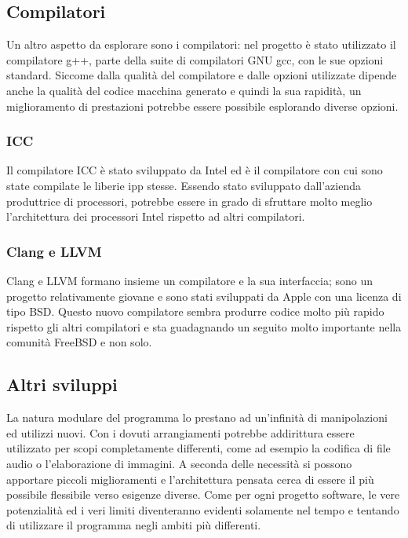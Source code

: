 \subsection{Compilatori}
Un altro aspetto da esplorare sono i compilatori: nel progetto \`e stato
utilizzato il compilatore g++, parte della suite di compilatori GNU gcc, con le
sue opzioni standard. Siccome dalla qualit\`a del compilatore e dalle opzioni
utilizzate dipende anche la qualit\`a del codice macchina generato e quindi la
sua rapidit\`a, un miglioramento di prestazioni potrebbe essere possibile
esplorando diverse opzioni.

\subsubsection{ICC}
Il compilatore ICC \`e stato sviluppato da Intel ed \`e il compilatore con cui
sono state compilate le liberie \ac{ipp} stesse. Essendo stato sviluppato
dall'azienda produttrice di processori, potrebbe essere in grado di sfruttare
molto meglio l'architettura dei processori Intel rispetto ad altri compilatori.

\subsubsection{Clang e LLVM}
Clang e LLVM formano insieme un compilatore e la sua interfaccia; sono un
progetto relativamente giovane e sono stati sviluppati da Apple con una licenza
di tipo BSD. Questo nuovo compilatore sembra produrre codice molto più rapido
rispetto gli altri compilatori e sta guadagnando un seguito molto importante
nella comunit\`a FreeBSD e non solo.

\subsection{Altri sviluppi}
La natura modulare del programma lo prestano ad un'infinit\`a di manipolazioni
ed utilizzi nuovi. Con i dovuti arrangiamenti potrebbe addirittura essere
utilizzato per scopi completamente differenti, come ad esempio la codifica di
file audio o l'elaborazione di immagini. A seconda delle necessit\`a si possono
apportare piccoli miglioramenti e l'architettura pensata cerca di essere il
pi\`u possibile flessibile verso esigenze diverse. Come per ogni progetto
software, le vere potenzialit\`a ed i veri limiti diventeranno evidenti
solamente nel tempo e tentando di utilizzare il programma negli ambiti pi\`u
differenti.

